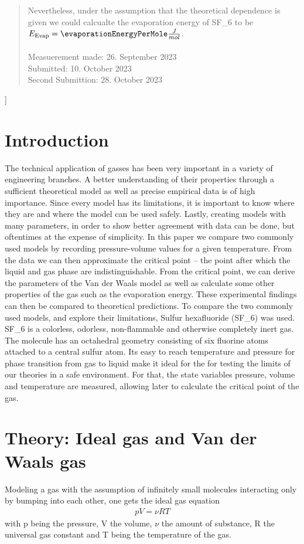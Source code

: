 \documentclass[a4paper,10pt,twocolumn]{article}
\begin{document}
{\begin{abstract}
       Nevertheless, under the assumption that the theoretical dependence is given we could calcualte the evaporation energy of SF_6\) to be $E_{\text{Evap}}=\evaporationEnergyPerMole \frac{J}{mol}$.
       \\
       \\
        Measuerement made: 26. September 2023\\       %
        Submitted: 10. October 2023  \\
        Second Submittion: 28. October 2023%
        \\
    \end{abstract}
    }]
    \section{Introduction}\label{sec:introdction}
    The technical application of gasses has been very important in a variety of engineering branches. 
    A better understanding of their properties through a sufficient theoretical model as well as precise empirical data is of high importance.
    Since every model has its limitations, it is important to know where they are and where the model can be used safely.
    Lastly, creating models with many parameters, in order to show better agreement with data can be done, but oftentimes at the expense of simplicity.
    In this paper we compare two commonly used models by recording pressure-volume values for a given temperature.
    From the data we can then approximate the critical point -- the point after which the liquid and gas phase are indistinguishable.
    From the critical point, we can derive the parameters of the Van der Waals model as well as calculate some other properties of the gas such as the evaporation energy.
    These experimental findings can then be compared to theoretical predictions.
    To compare the two commonly used models, and explore their limitations, Sulfur hexafluoride (SF_6\)) was used.
    SF_6\) is a colorless, odorless, non-flammable and otherwise completely inert gas. 
    The molecule has an octahedral geometry consisting of six fluorine atoms attached to a central sulfur atom.
    Its easy to reach temperature and pressure for phase transition from gas to liquid make it ideal for the for testing the limits of our theories in a safe environment.
    For that, the state variables pressure, volume and temperature are measured, allowing later to calculate the critical point of the gas.
    \section{Theory: Ideal gas and Van der Waals gas}\label{sec:theory}
    Modeling a gas with the assumption of infinitely small molecules interacting only by bumping into each other, one gets the ideal gas equation
    \begin{align}
        pV=\nu RT
    \end{align}
    with p being the pressure, V the volume, $\nu$ the amount of substance, R the universal gas constant and T being the temperature of the gas.
\end{document}

